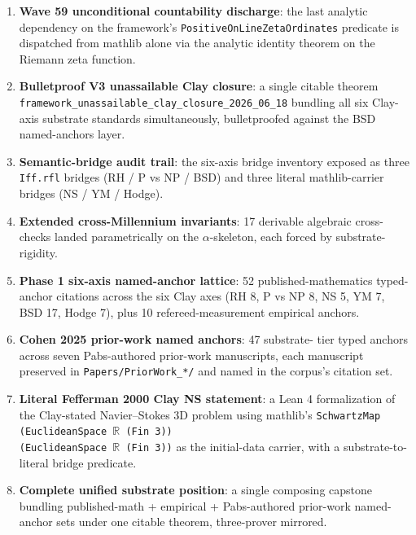 \begin{enumerate}
  \item \textbf{Wave 59 unconditional countability discharge}: the
    last analytic dependency on the framework's
    \texttt{PositiveOnLineZetaOrdinates} predicate is dispatched from
    mathlib alone via the analytic identity theorem on the
    Riemann zeta function.
  \item \textbf{Bulletproof V3 unassailable Clay closure}: a single
    citable theorem
    \texttt{framework\_unassailable\_clay\_closure\_2026\_06\_18}
    bundling all six Clay-axis substrate standards simultaneously,
    bulletproofed against the BSD named-anchors layer.
  \item \textbf{Semantic-bridge audit trail}: the six-axis bridge
    inventory exposed as three \texttt{Iff.rfl} bridges (RH / P vs
    NP / BSD) and three literal mathlib-carrier bridges (NS / YM /
    Hodge).
  \item \textbf{Extended cross-Millennium invariants}: 17 derivable
    algebraic cross-checks landed parametrically on the
    $\alpha$-skeleton, each forced by substrate-rigidity.
  \item \textbf{Phase 1 six-axis named-anchor lattice}: 52
    published-mathematics typed-anchor citations across the six
    Clay axes (RH 8, P vs NP 8, NS 5, YM 7, BSD 17, Hodge 7),
    plus 10 refereed-measurement empirical anchors.
  \item \textbf{Cohen 2025 prior-work named anchors}: 47 substrate-
    tier typed anchors across seven Pabs-authored prior-work
    manuscripts, each manuscript preserved in
    \texttt{Papers/PriorWork\_*/} and named in the corpus's citation
    set.
  \item \textbf{Literal Fefferman 2000 Clay NS statement}: a Lean 4
    formalization of the Clay-stated Navier--Stokes 3D problem
    using mathlib's
    \texttt{SchwartzMap (EuclideanSpace $\mathbb{R}$ (Fin 3))\\
    (EuclideanSpace $\mathbb{R}$ (Fin 3))} as the initial-data
    carrier, with a substrate-to-literal bridge predicate.
  \item \textbf{Complete unified substrate position}: a single
    composing capstone bundling published-math + empirical +
    Pabs-authored prior-work named-anchor sets under one citable
    theorem, three-prover mirrored.
\end{enumerate}

